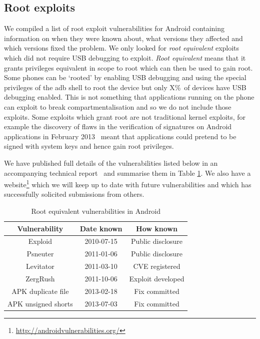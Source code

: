 \documentclass[conference,a4paper,twoside]{IEEEtran}
\newcommand{\daAdbPerc}{X\%}
\begin{document}
\subsection{Root exploits}
We compiled a list of root exploit vulnerabilities for Android containing information on when they were known about, what versions they affected and which versions fixed the problem.
We only looked for \emph{root equivalent} exploits which did not require USB debugging to exploit.
\emph{Root equivalent} means that it grants privileges equivalent in scope to root which can then be used to gain root.
Some phones can be `rooted' by enabling USB debugging and using the special privileges of the adb shell to root the device but only \daAdbPerc\ of devices have USB debugging enabled.
This is not something that applications running on the phone can exploit to break compartmentalisation and so we do not include those exploits.
Some exploits which grant root are not traditional kernel exploits, for example the discovery of flaws in the verification of signatures on Android applications in February 2013~\cite{Forristal2013} meant that applications could pretend to be signed with system keys and hence gain root privileges.

We have published full details of the vulnerabilities listed below in an accompanying technical report~\cite{TODO} and summarise them in Table \ref{tab:andvulns}.
We also have a website\footnote{\url{http://androidvulnerabilities.org/}} which we will keep up to date with future vulnerabilities and which has successfully solicited submissions from others.

\begin{table}
\centering
\begin{tabular}{c|c|c}
Vulnerability & Date known & How known \\
\hline
Exploid & 2010-07-15 & Public disclosure \\
Psneuter & 2011-01-06 & Public disclosure \\
Levitator & 2011-03-10 & CVE registered \\
ZergRush & 2011-10-06 & Exploit developed \\
APK duplicate file & 2013-02-18 & Fix committed \\
APK unsigned shorts & 2013-07-03 & Fix committed \\
\end{tabular}
\caption{Root equivalent vulnerabilities in Android}
\label{tab:andvulns}
\end{table}
\end{document}
